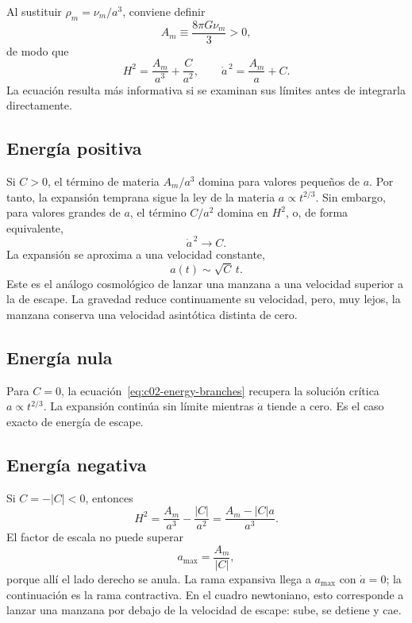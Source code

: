 Al sustituir \(\rho_m=\nu_m/a^3\), conviene definir
\begin{equation}
A_m\equiv\frac{8\pi G\nu_m}{3}>0,
\end{equation}
de modo que
\begin{equation}
H^2=\frac{A_m}{a^3}+\frac{C}{a^2},
\qquad
\dot a^{\,2}=\frac{A_m}{a}+C.
\label{eq:c02-energy-branches}
\end{equation}
La ecuación resulta más informativa si se examinan sus límites antes de integrarla directamente.

\subsection{Energía positiva}

Si \(C>0\), el término de materia \(A_m/a^3\) domina para valores pequeños de \(a\). Por tanto, la expansión temprana sigue la ley de la materia \(a\propto t^{2/3}\). Sin embargo, para valores grandes de \(a\), el término \(C/a^2\) domina en \(H^2\), o, de forma equivalente,
\begin{equation}
\dot a^{\,2}\longrightarrow C.
\end{equation}
La expansión se aproxima a una velocidad constante,
\begin{equation}
a(t)\sim\sqrt C\,t.
\label{eq:c02-positive-late}
\end{equation}
Este es el análogo cosmológico de lanzar una manzana a una velocidad superior a la de escape. La gravedad reduce continuamente su velocidad, pero, muy lejos, la manzana conserva una velocidad asintótica distinta de cero.

\subsection{Energía nula}

Para \(C=0\), la ecuación~\eqref{eq:c02-energy-branches} recupera la solución crítica \(a\propto t^{2/3}\). La expansión continúa sin límite mientras \(\dot a\) tiende a cero. Es el caso exacto de energía de escape.

\subsection{Energía negativa}

Si \(C=-|C|<0\), entonces
\begin{equation}
H^2=\frac{A_m}{a^3}-\frac{|C|}{a^2}
=\frac{A_m-|C|a}{a^3}.
\label{eq:c02-negative-energy}
\end{equation}
El factor de escala no puede superar
\begin{equation}
a_{\max}=\frac{A_m}{|C|},
\label{eq:c02-amax}
\end{equation}
porque allí el lado derecho se anula. La rama expansiva llega a \(a_{\max}\) con \(\dot a=0\); la continuación es la rama contractiva. En el cuadro newtoniano, esto corresponde a lanzar una manzana por debajo de la velocidad de escape: sube, se detiene y cae.

